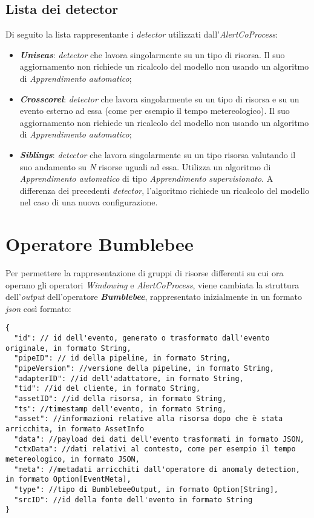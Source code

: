 \subsection{Lista dei detector}\label{sec:detector-alertcoprocess}
Di seguito la lista rappresentante i \textit{detector} utilizzati dall'\textit{AlertCoProcess}:
\begin{itemize}
	\item{\textbf{\textit{Uniseas}}: \textit{detector} che lavora singolarmente su un tipo di risorsa. Il suo aggiornamento non richiede un ricalcolo del modello non usando un algoritmo di \textit{\gls{Apprendimento automatico}};}
	\item{\textbf{\textit{Crosscorel}}: \textit{detector} che lavora singolarmente su un tipo di risorsa e su un evento esterno ad essa (come per esempio il tempo metereologico). Il suo aggiornamento non richiede un ricalcolo del modello non usando un algoritmo di \textit{\gls{Apprendimento automatico}};}
	\item{\textbf{\textit{Siblings}}: \textit{detector} che lavora singolarmente su un tipo risorsa valutando il suo andamento su \textit{N} risorse uguali ad essa. Utilizza un algoritmo di \textit{\gls{Apprendimento automatico}} di tipo \textit{\gls{Apprendimento supervisionato}}. A differenza dei precedenti \textit{detector}, l'algoritmo richiede un ricalcolo del modello nel caso di una nuova configurazione.}
\end{itemize}


\section{Operatore Bumblebee}\label{sec:bbout}
Per permettere la rappresentazione di gruppi di risorse differenti su cui ora operano gli operatori \textit{Windowing} e \textit{AlertCoProcess}, viene cambiata la struttura dell'\textit{output} dell'operatore \textbf{\textit{Bumblebee}}, rappresentato inizialmente in un formato \textit{\gls{json}} così formato:

\begin{verbatim}
{
  "id": // id dell'evento, generato o trasformato dall'evento originale, in formato String,
  "pipeID": // id della pipeline, in formato String,
  "pipeVersion": //versione della pipeline, in formato String,
  "adapterID": //id dell'adattatore, in formato String,
  "tid": //id del cliente, in formato String,
  "assetID": //id della risorsa, in formato String,
  "ts": //timestamp dell'evento, in formato String,
  "asset": //informazioni relative alla risorsa dopo che è stata arricchita, in formato AssetInfo
  "data": //payload dei dati dell'evento trasformati in formato JSON,
  "ctxData": //dati relativi al contesto, come per esempio il tempo metereologico, in formato JSON,
  "meta": //metadati arricchiti dall'operatore di anomaly detection, in formato Option[EventMeta],
  "type": //tipo di BumblebeeOutput, in formato Option[String],
  "srcID": //id della fonte dell'evento in formato String
}
\end{verbatim}

